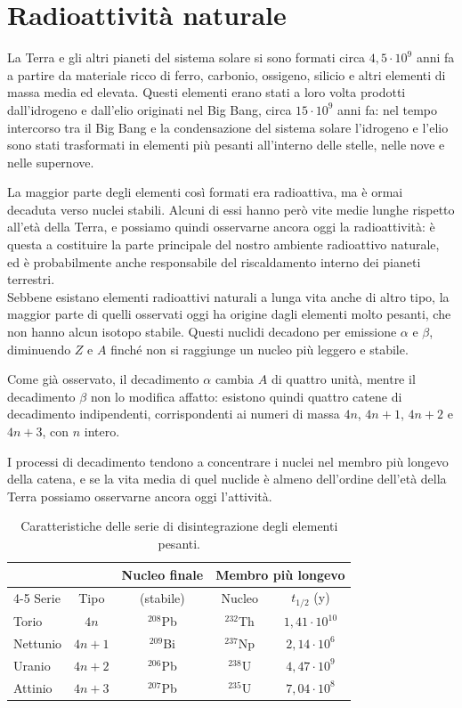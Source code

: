 \newpage

\section{Radioattività naturale}

La Terra e gli altri pianeti del sistema solare si sono formati circa $4,5 \cdot 10^9$ anni fa a partire da materiale ricco di ferro, carbonio, ossigeno, silicio e altri elementi di massa media ed elevata. Questi elementi erano stati a loro volta prodotti dall'idrogeno e dall'elio originati nel Big Bang, circa $15 \cdot 10^9$ anni fa: nel tempo intercorso tra il Big Bang e la condensazione del sistema solare l'idrogeno e l'elio sono stati trasformati in elementi più pesanti all'interno delle stelle, nelle nove e nelle supernove. 

La maggior parte degli elementi così formati era radioattiva, ma è ormai decaduta verso nuclei stabili. Alcuni di essi hanno però vite medie lunghe rispetto all'età della Terra, e possiamo quindi osservarne ancora oggi la radioattività: è questa a costituire la parte principale del nostro ambiente radioattivo naturale, ed è probabilmente anche responsabile del riscaldamento interno dei pianeti terrestri.\\

Sebbene esistano elementi radioattivi naturali a lunga vita anche di altro tipo, la maggior parte di quelli osservati oggi ha origine dagli elementi molto pesanti, che non hanno alcun isotopo stabile. Questi nuclidi decadono per emissione $\alpha$ e $\beta$, diminuendo $Z$ e $A$ finché non si raggiunge un nucleo più leggero e stabile. 

Come già osservato, il decadimento $\alpha$ cambia $A$ di quattro unità, mentre il decadimento $\beta$ non lo modifica affatto: esistono quindi quattro catene di decadimento indipendenti, corrispondenti ai numeri di massa $4n$, $4n+1$, $4n+2$ e $4n+3$, con $n$ intero. 

I processi di decadimento tendono a concentrare i nuclei nel membro più longevo della catena, e se la vita media di quel nuclide è almeno dell'ordine dell'età della Terra possiamo osservarne ancora oggi l'attività. 

\begin{table}[htbp]
\centering
\begin{tabular}{lcccc}
\hline
 & & Nucleo finale & \multicolumn{2}{c}{Membro più longevo} \\
\cline{4-5}
Serie & Tipo & (stabile) & Nucleo & $t_{1/2}$ (y) \\
\hline
Torio     & $4n$   & ${}^{208}$Pb & ${}^{232}$Th & $1{,}41 \cdot 10^{10}$ \\
Nettunio  & $4n+1$ & ${}^{209}$Bi & ${}^{237}$Np & $2{,}14 \cdot 10^{6}$ \\
Uranio    & $4n+2$ & ${}^{206}$Pb & ${}^{238}$U  & $4{,}47 \cdot 10^{9}$ \\
Attinio   & $4n+3$ & ${}^{207}$Pb & ${}^{235}$U  & $7{,}04 \cdot 10^{8}$ \\
\hline
\end{tabular}
\caption{Caratteristiche delle serie di disintegrazione degli elementi pesanti.}
\label{tab:serie_naturali}
\end{table}

